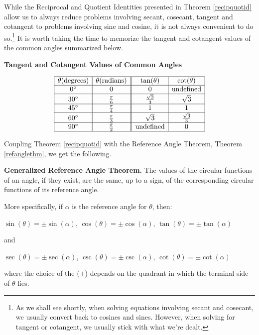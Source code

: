 \documentclass{ximera}
\begin{document}
While the Reciprocal and Quotient Identities presented in Theorem \ref{recipquotid} allow us to always reduce problems involving secant, cosecant, tangent and cotangent to problems involving sine and cosine, it is not always convenient to do so.\footnote{As we shall see shortly, when solving equations involving secant and cosecant, we usually convert back to cosines and sines.  However, when solving for tangent or cotangent, we usually stick with what we're dealt.}  It is worth taking the time to memorize the tangent and cotangent values of the common angles summarized below.



\begin{center}

\textbf{Tangent and Cotangent Values of Common Angles}



\[ \begin{array}{|c|c||c|c|} \hline
 \theta (\mbox{degrees}) &  \theta (\mbox{radians}) & \tan(\theta) & \cot(\theta) \\ \hline
0^{\circ} & 0 & 0 & \text{undefined} \\ \hline
30^{\circ} & \frac{\pi}{6} & \frac{\sqrt{3}}{3} & \sqrt{3} \\ \hline
45^{\circ} & \frac{\pi}{4} & 1 & 1 \\ \hline
60^{\circ} & \frac{\pi}{3} & \sqrt{3} & \frac{\sqrt{3}}{3} \\ \hline
90^{\circ} & \frac{\pi}{2} & \text{undefined} & 0 \\ \hline
\end{array} \]

\end{center}

Coupling Theorem \ref{recipquotid} with the Reference Angle Theorem, Theorem \ref{refanglethm}, we get the following.


\begin{theorem} \label{genrefanglethm} \textbf{Generalized Reference Angle Theorem.}  The values of the circular functions of an angle, if they exist, are the same, up to a sign, of the corresponding circular functions of its reference angle. 



More specifically, if $\alpha$ is the reference angle for $\theta$,  then: 



  \centerline{$\sin(\theta) = \pm \sin(\alpha)$,  $\cos(\theta) = \pm \cos(\alpha)$,  $\tan(\theta) = \pm \tan(\alpha)$}
  
  \centerline{and}
  
    \centerline{$\sec(\theta) = \pm \sec(\alpha)$,  $\csc(\theta) = \pm \csc(\alpha)$,  $\cot(\theta) = \pm \cot(\alpha)$}
    
    


where the choice of the ($\pm$) depends on the quadrant in which the terminal side of $\theta$ lies.

\end{theorem}
\end{document}
